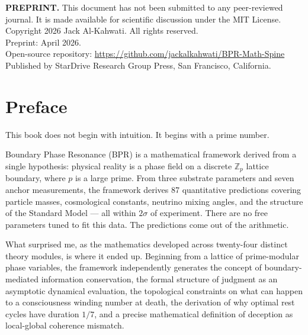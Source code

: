 \documentclass[12pt,oneside]{book}
\theoremstyle{definition}
\begin{document}
\thispagestyle{empty}\vspace*{\fill}
\noindent\textbf{PREPRINT.} This document has not been submitted to any peer-reviewed
journal. It is made available for scientific discussion under the MIT License.\\[1.5ex]
\noindent Copyright \textcopyright{} 2026 Jack Al-Kahwati. All rights reserved.\\[1ex]
Preprint: April 2026.\\
Open-source repository: \url{https://github.com/jackalkahwati/BPR-Math-Spine}\\[1ex]
Published by StarDrive Research Group Press, San Francisco, California.
\vspace*{\fill}\clearpage

\tableofcontents

\chapter*{Preface}

This book does not begin with intuition. It begins with a prime number.

Boundary Phase Resonance (BPR) is a mathematical framework derived from a single
hypothesis: physical reality is a phase field on a discrete $\mathbb{Z}_p$ lattice
boundary, where $p$ is a large prime. From three substrate parameters and seven
anchor measurements, the framework derives 87 quantitative predictions covering
particle masses, cosmological constants, neutrino mixing angles, and the structure
of the Standard Model --- all within $2\sigma$ of experiment. There are no free
parameters tuned to fit this data. The predictions come out of the arithmetic.

What surprised me, as the mathematics developed across twenty-four distinct theory
modules, is where it ended up. Beginning from a lattice of prime-modular phase
variables, the framework independently generates the concept of boundary-mediated
information conservation, the formal structure of judgment as an asymptotic
dynamical evaluation, the topological constraints on what can happen to a
consciousness winding number at death, the derivation of why optimal rest cycles
have duration $1/7$, and a precise mathematical definition of deception as
local-global coherence mismatch.
\end{document}

